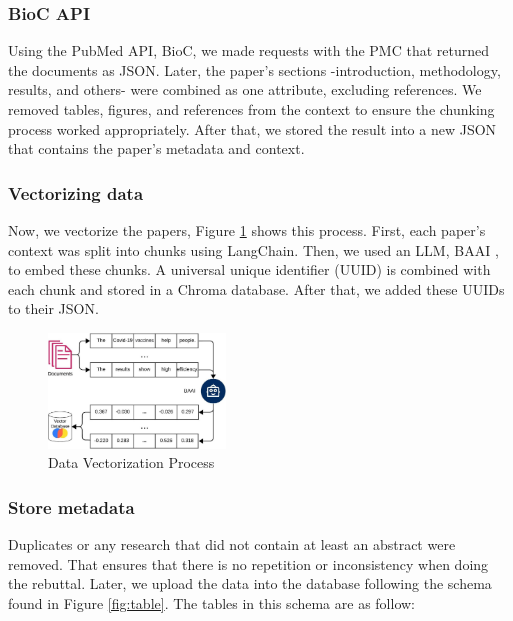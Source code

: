 \subsubsection{BioC API}
Using the PubMed API, BioC, we made requests with the PMC that returned the documents as JSON. Later, the paper's sections -introduction, methodology, results, and others- were combined as one attribute, excluding references. We removed tables, figures, and references from the context to ensure the chunking process worked appropriately. After that, we stored the result into a new JSON that contains the paper's metadata and context. 

\subsubsection{Vectorizing data}
Now, we vectorize the papers, Figure \ref{fig:vector} shows this process. First, each paper’s context was split into chunks using LangChain. Then, we used an LLM, BAAI \cite{bge_embedding}, to embed these chunks. A universal unique identifier (UUID) is combined with each chunk and stored in a Chroma database. After that, we added these UUIDs to their JSON. 

\begin{figure}[htbp]
	\begin{center}
		\includegraphics[width=0.42\textwidth]{figures/Data_vectorization.jpeg} %
	\end{center}
	\caption{Data Vectorization Process} %
	\label{fig:vector}
\end{figure}


\subsubsection{Store metadata}
Duplicates or any research that did not contain at least an abstract were removed. That ensures that there is no repetition or inconsistency when doing the rebuttal. Later, we upload the data into the database following the schema found in Figure \ref{fig:table}. The tables in this schema are as follow:

